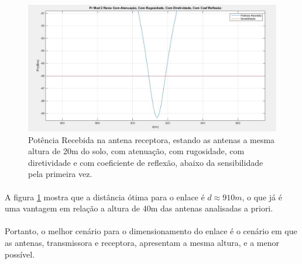 \FloatBarrier
\begin{figure}[!htp]
\centering
\includegraphics[scale = 0.3]{Figuras/Pr_h_20__2.JPG}
\caption{Potência Recebida na antena receptora, estando as antenas a mesma altura de 20m do solo, com atenuação, com rugosidade, com diretividade e com coeficiente de reflexão, abaixo da sensibilidade pela primeira vez.}
\label{h20}
\end{figure}

\FloatBarrier

\paragraph{}A figura \ref{h20} mostra que a distância ótima para o enlace é  $d \approx 910m$, o que já é uma vantagem em relação a altura de 40m das antenas analisadas a priori.


\paragraph{}Portanto, o melhor cenário para o dimensionamento do enlace é o cenário em que as antenas, transmissora e receptora, apresentam a mesma altura, e a menor possível. 